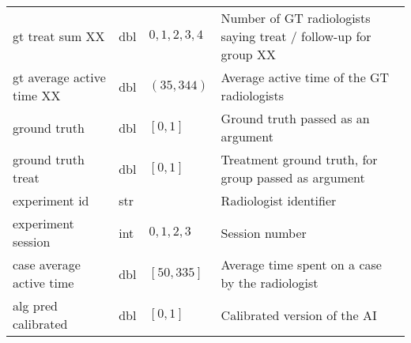 {\begin{tabular}{|l|l|l|l|}
gt treat sum XX & dbl & ${0,1,2,3,4}$ & Number of GT radiologists saying treat / follow-up for group XX \\
gt average active time XX & dbl & $(35,344)$ & Average active time of the GT radiologists \\
ground truth & dbl & $[0,1]$ & Ground truth passed as an argument \\
ground truth treat & dbl & $[0,1]$ & Treatment ground truth, for group passed as argument \\
experiment id & str & & Radiologist identifier \\
experiment session & int & ${0,1,2,3}$ & Session number \\
case average active time & dbl & $[50,335]$ & Average time spent on a case by the radiologist \\
alg pred calibrated & dbl & $[0,1]$ & Calibrated version of the AI \\

\bottomrule[1pt]
\end{tabular}%
}
